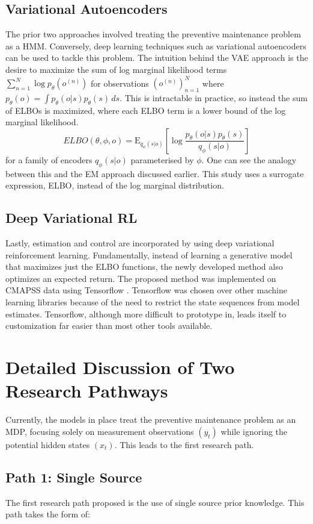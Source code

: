\documentclass[english]{article}
\numberwithin{equation}{section}
\newcommand{\E}{\mathrm{E}}
\begin{document}
	\subsection*{Variational Autoencoders}
	The prior two approaches involved treating the preventive maintenance problem as a HMM. Conversely, deep learning techniques such as variational autoencoders can be used to tackle this problem. The intuition behind the VAE approach is the desire to maximize the sum of log marginal likelihood terms $\sum_{n=1}^N \log p_{\theta}(o^{(n)})$ for observations $(o^{(n)})_{n=1}^N$ where $p_{\theta}(o)=\int p_{\theta}(o|s)p_{\theta}(s)\,ds.$ This is intractable in practice, so instead the sum of ELBOs is maximized, where each ELBO term is a lower bound of the log marginal likelihood.
	$$ELBO(\theta,\phi,o)=\E_{q_{\phi}(s|o)}[\log \frac{p_{\theta}(o|s)p_{\theta}(s)}{q_{\phi}(s|o)}]$$ for a family of encoders $q_{\phi}(s|o)$ parameterised by $\phi$. One can see the analogy between this and the EM approach discussed earlier. This study uses a surrogate expression, ELBO, instead of the log marginal distribution. 
	
	\subsection*{Deep Variational RL}
	Lastly, estimation and control are incorporated by using deep variational reinforcement learning. Fundamentally, instead of learning a generative model that maximizes just the ELBO functions, the newly developed method also optimizes an expected return. The proposed method was implemented on CMAPSS data using Tensorflow \cite{tensor}.  Tensorflow was chosen over other machine learning libraries because of the need to restrict the state sequences from model estimates. Tensorflow, although more difficult to prototype in, leads itself to customization far easier than most other tools available.
	 
	\section*{Detailed Discussion of Two Research Pathways}
	Currently, the models in place treat the preventive maintenance problem as an MDP, focusing solely on measurement observations $(y_t)$ while ignoring the potential hidden states $(x_t)$. This leads to the first research path.
	
	\subsection*{Path 1: Single Source}
	The first research path proposed is the use of single source prior knowledge.  This path takes the form of:
	
\end{document}
